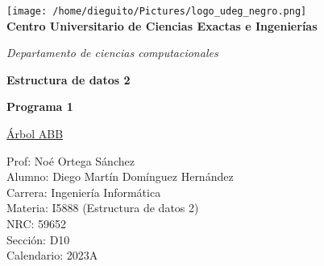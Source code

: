 \usepackage[a4paper,margin=1in,footskip=0.25in]{geometry}
\usepackage{graphicx}

\begin{titlepage}
\begin{center}
	\texttt{[image: /home/dieguito/Pictures/logo\_udeg\_negro.png]}\\
	\vspace{1cm}
{\Large 	\textbf{Centro Universitario de Ciencias Exactas e Ingenierías}\\}

\vspace{0.5cm}
	
{\large 	\textit{Departamento de ciencias computacionales}\\}
	
	\vspace{1cm}
	
	\textbf{Estructura de datos 2}\\
	
	\vspace{0.5cm}
	
	\textbf{Programa 1}\\
	
	\vspace{0.5cm}
	
	\vspace{0.5cm}
	
	\underline{Árbol ABB}\\
	
	\vspace{1cm}
	
	Prof: Noé Ortega Sánchez\\
	
	Alumno: Diego Martín Domínguez Hernández\\
	
	Carrera: Ingeniería Informática \\
	
	Materia: I5888 (Estructura de datos 2)\\
	
	NRC: 59652\\
	
	Sección: D10\\

	Calendario: 2023A\\
	
\end{center}
\end{titlepage}
